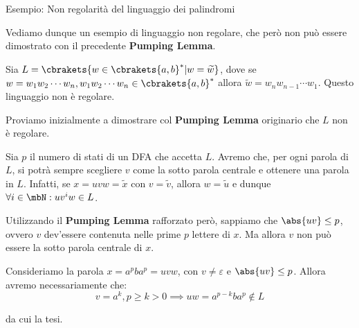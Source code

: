 \begin{generalbox}[colframe=azure-gradient-3!90!black]{Esempio: Non regolarità del linguaggio dei palindromi}

  Vediamo dunque un esempio di linguaggio non regolare, che però non può essere dimostrato con il precedente \textbf{Pumping Lemma}.

  \medskip

  Sia \(L = \cbrakets{w \in \cbrakets{a,b}^* \vert w=\widetilde{w} } \), dove se \( w=w_1w_2\cdots w_n, w_1w_2\cdots w_n \in \cbrakets{a,b}^* \) allora \( \widetilde{w} = w_{n}w_{n-1}\cdots w_1 \). Questo linguaggio non è regolare.

  \medskip

  Proviamo inizialmente a dimostrare col \textbf{Pumping Lemma} originario che \(L\) non è regolare.

  \medskip

  Sia \(p\) il numero di stati di un DFA che accetta \(L\). Avremo che, per ogni parola di \(L\), si potrà sempre scegliere \(v\) come la sotto parola centrale e ottenere una parola in \(L\). Infatti, se \(x=uvw=\widetilde{x}\) con \(v=\widetilde{v}\), allora \(w=\widetilde{u}\) e dunque \(\forall i \in \mbN: uv^{i}w \in L\).

  \medskip

  Utilizzando il \textbf{Pumping Lemma} rafforzato però, sappiamo che \(\abs{uv} \leq p\), ovvero \(v\) dev'essere contenuta nelle prime \(p\) lettere di \(x\). Ma allora \(v\) non può essere la sotto parola centrale di \(x\).

  Consideriamo la parola \(x=a^{p}ba^{p} = uvw \), con \(v \neq \varepsilon \) e \(\abs{uv} \leq p\). Allora avremo necessariamente che:
  \begin{equation}
    v=a^k, p\geq k>0 \implies uw=a^{p-k}ba^{p} \nin L
  \end{equation}

  da cui la tesi.
\end{generalbox}
